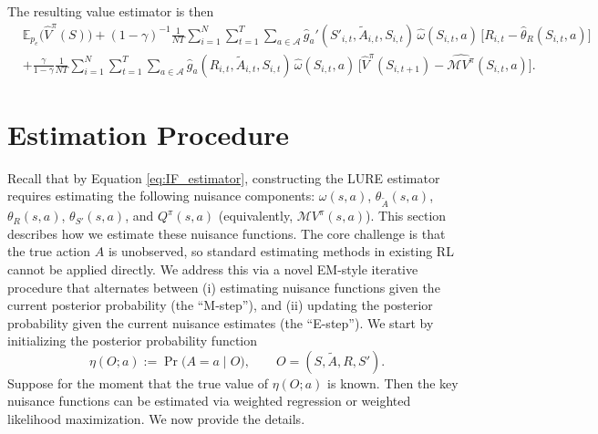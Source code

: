\documentclass[12pt]{article}
\newcommand{\0}{\boldsymbol{0}}
\newtheorem{remark}{Remark}
\newcommand{\E}{\mathbb{E}}
\begin{document}
The resulting value estimator is then
\begin{align} \label{eq:IF_estimator} 
& \E_{p_e}\big(\widehat V^\pi(S)\big)
+(1-\gamma)^{-1}\frac{1}{NT}\sum_{i=1}^N\sum_{t=1}^T\sum_{a\in\mathcal A}
\widehat g_a'(S'_{i,t},\widetilde A_{i,t},S_{i,t})\,\widehat\omega(S_{i,t},a)\,\Big[R_{i,t}-\widehat\theta_R(S_{i,t},a)\Big]
\nonumber\\
&+\frac{\gamma}{1-\gamma}\frac{1}{NT}\sum_{i=1}^N\sum_{t=1}^T\sum_{a\in\mathcal A}
\widehat g_a(R_{i,t},\widetilde A_{i,t},S_{i,t})\,\widehat\omega(S_{i,t},a)\,\Big[\widehat V^\pi(S_{i,t+1})-\widehat {\mathcal M V^{\pi}}(S_{i,t},a)\Big].
\end{align} 




\section{Estimation Procedure} \label{sec: estimation}

Recall that by Equation \eqref{eq:IF_estimator},
constructing the LURE estimator requires estimating the following nuisance components: $\omega(s,a)$, $\theta_{\widetilde A}(s,a)$, $\theta_{R}(s,a)$, $\theta_{S'}(s,a)$, and $Q^\pi(s,a)$ (equivalently, $\mathcal{M}V^\pi(s,a)$). This section describes how we estimate these nuisance functions. The core challenge is that the true action $A$ is unobserved, so standard estimating methods in existing RL cannot be applied directly. We address this via a novel EM-style \citep{dempster1977maximum} iterative procedure that alternates between
(i) estimating nuisance functions given the current posterior probability (the ``M-step''), and
(ii) updating the posterior probability given the current nuisance estimates (the ``E-step'').
We start by initializing the posterior probability function
\[
\eta(O;a)
:=
\Pr\big(A=a\mid O\big),
\qquad
O=(S,\widetilde A,R,S').
\]
Suppose for the moment that the true value of $\eta(O;a)$ is known. Then the key nuisance functions can be estimated via weighted regression or weighted likelihood maximization. We now provide the details.
\end{document}

